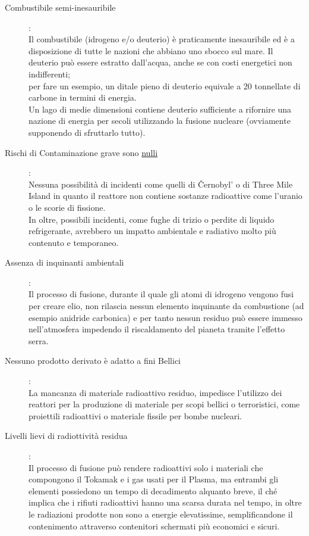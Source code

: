 \begin{description}
	\item [Combustibile semi-inesauribile]:\\
	      Il combustibile (idrogeno e/o deuterio) è praticamente inesauribile ed è a disposizione di tutte le nazioni che abbiano uno sbocco sul mare. Il deuterio può essere estratto dall'acqua, anche se con costi energetici non indifferenti;\\
	      per fare un esempio, un ditale pieno di deuterio equivale a 20 tonnellate di carbone in termini di energia.\\
	      Un lago di medie dimensioni contiene deuterio sufficiente a rifornire una nazione di energia per secoli utilizzando la fusione nucleare (ovviamente supponendo di sfruttarlo tutto).
	\item [Rischi di Contaminazione grave sono \underline{nulli}]:\\
	      Nessuna possibilità di incidenti come quelli di Černobyl' o di Three Mile Island in quanto il reattore non contiene sostanze radioattive come l'uranio o le scorie di fissione.\\
	      In oltre, possibili incidenti, come fughe di trizio o perdite di liquido refrigerante, avrebbero un impatto ambientale e radiativo molto più contenuto e temporaneo.
	\item [Assenza di inquinanti ambientali]:\\
	      Il processo di fusione, durante il quale gli atomi di idrogeno vengono fusi per creare elio, non rilascia nessun elemento inquinante da combustione (ad esempio anidride carbonica) e per tanto nessun residuo può essere immesso nell'atmosfera impedendo il riscaldamento del pianeta tramite l'effetto serra.
	\item [Nessuno prodotto derivato è adatto a fini Bellici]:\\
	      La mancanza di materiale radioattivo residuo, impedisce l'utilizzo dei reattori per la produzione di materiale per scopi bellici o terroristici, come proiettili radioattivi o materiale fissile per bombe nucleari.
	\item [Livelli lievi di radiottività residua]:\\
	      Il processo di fusione può rendere radioattivi solo i materiali che compongono il Tokamak e i gas usati per il Plasma, ma entrambi gli elementi possiedono un tempo di decadimento alquanto breve, il ché implica che i rifiuti radioattivi hanno una scarsa durata nel tempo, in oltre le radiazioni prodotte non sono a energie elevatissime, semplificandone il contenimento attraverso contenitori schermati più economici e sicuri.
\end{description}

